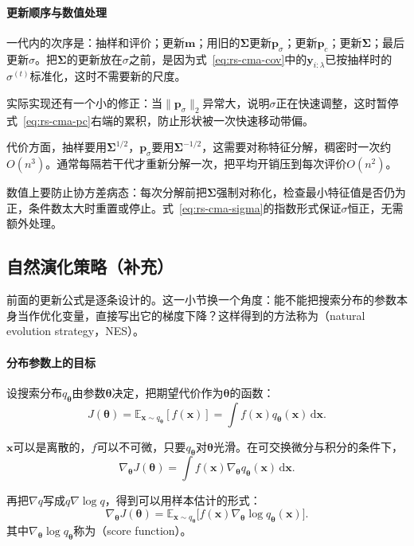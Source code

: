 \paragraph{更新顺序与数值处理}
一代内的次序是：抽样和评价；更新$\bm{m}$；用旧的$\bm{\Sigma}$更新$\bm{p}_\sigma$；更新$\bm{p}_c$；更新$\bm{\Sigma}$；最后更新$\sigma$。把$\bm{\Sigma}$的更新放在$\sigma$之前，是因为式~\eqref{eq:rs-cma-cov}中的$\bm{y}_{i:\lambda}$已按抽样时的$\sigma^{(t)}$标准化，这时不需要新的尺度。

实际实现还有一个小的修正：当$\lVert\bm{p}_\sigma\rVert_2$异常大，说明$\sigma$正在快速调整，这时暂停式~\eqref{eq:rs-cma-pc}右端的累积，防止形状被一次快速移动带偏。

代价方面，抽样要用$\bm{\Sigma}^{1/2}$，$\bm{p}_\sigma$要用$\bm{\Sigma}^{-1/2}$，这需要对称特征分解，稠密时一次约$O(n^3)$。通常每隔若干代才重新分解一次，把平均开销压到每次评价$O(n^2)$。

数值上要防止协方差病态：每次分解前把$\bm{\Sigma}$强制对称化，检查最小特征值是否仍为正，条件数太大时重置或停止。式~\eqref{eq:rs-cma-sigma}的指数形式保证$\sigma$恒正，无需额外处理。

\subsection{自然演化策略（补充）}
\label{sec:rs-es-nes}

前面的更新公式是逐条设计的。这一小节换一个角度：能不能把搜索分布的参数本身当作优化变量，直接写出它的梯度下降？这样得到的方法称为（natural evolution strategy，NES）。

\paragraph{分布参数上的目标}
设搜索分布$q_{\bm{\theta}}$由参数$\bm{\theta}$决定，把期望代价作为$\bm{\theta}$的函数：
\begin{equation}
 J(\bm{\theta})=\mathbb{E}_{\bm{x}\sim q_{\bm{\theta}}}[f(\bm{x})]=\int f(\bm{x})q_{\bm{\theta}}(\bm{x})\,\mathrm{d}\bm{x}.
 \label{eq:rs-nes-objective}
\end{equation}

$\bm{x}$可以是离散的，$f$可以不可微，只要$q_{\bm{\theta}}$对$\bm{\theta}$光滑。在可交换微分与积分的条件下，
\[
 \nabla_{\bm{\theta}}J(\bm{\theta})=\int f(\bm{x})\nabla_{\bm{\theta}}q_{\bm{\theta}}(\bm{x})\,\mathrm{d}\bm{x}.
\]

再把$\nabla q$写成$q\nabla\log q$，得到可以用样本估计的形式：
\begin{equation}
 \nabla_{\bm{\theta}}J(\bm{\theta})=\mathbb{E}_{\bm{x}\sim q_{\bm{\theta}}}\bigl[f(\bm{x})\nabla_{\bm{\theta}}\log q_{\bm{\theta}}(\bm{x})\bigr].
 \label{eq:rs-score-gradient}
\end{equation}
其中$\nabla_{\bm{\theta}}\log q_{\bm{\theta}}$称为（score function）。

